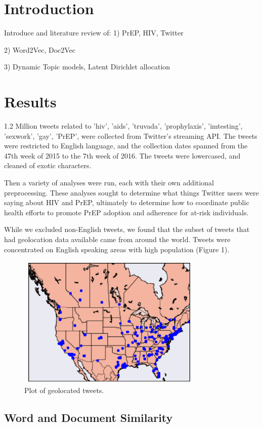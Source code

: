 \documentclass{sig-alternate-05-2015}
\begin{document}
\section{Introduction}

Introduce and literature review of:
1) PrEP, HIV, Twitter


2) Word2Vec, Doc2Vec


3) Dynamic Topic models, Latent Dirichlet allocation


\section{Results}

1.2 Million tweets related to 'hiv', 'aids', 'truvada', 'prophylaxis', 'imtesting', 'sexwork', 'gay', 'PrEP', were collected from Twitter's streaming API. The tweets were restricted to English language, and the collection dates spanned from the 47th week of 2015 to the 7th week of 2016. The tweets were lowercased, and cleaned of exotic characters.

Then a variety of analyses were run, each with their own additional preprocessing. These analyses sought to determine what things Twitter users were saying about HIV and PrEP, ultimately to determine how to coordinate public health efforts to promote PrEP adoption and adherence for at-risk individuals.

While we excluded non-English tweets, we found that the subset of tweets that had geolocation data available came from around the world. Tweets were concentrated on English speaking areas with high population (Figure 1).

\begin{figure}
\centering
\includegraphics[height=2.5in, width=3.5in]{map}
\caption{Plot of geolocated tweets.}
\end{figure}

\subsection{Word and Document Similarity}
\end{document}
